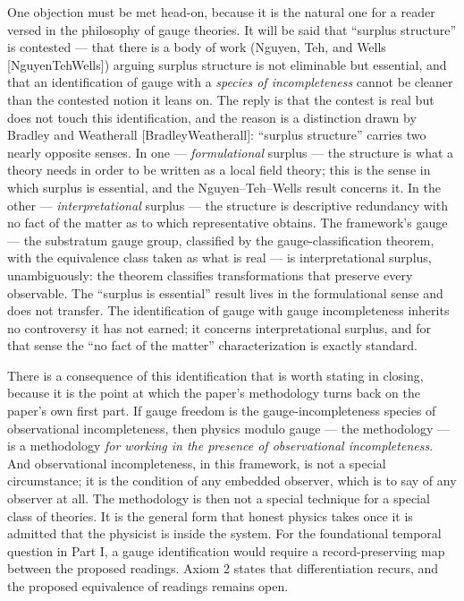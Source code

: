 \documentclass[
]{article}
\begin{document}
One objection must be met head-on, because it is the natural one for a
reader versed in the philosophy of gauge theories. It will be said that
``surplus structure'' is contested --- that there is a body of work
(Nguyen, Teh, and Wells {[}NguyenTehWells{]}) arguing surplus structure
is not eliminable but essential, and that an identification of gauge
with a \emph{species of incompleteness} cannot be cleaner than the
contested notion it leans on. The reply is that the contest is real but
does not touch this identification, and the reason is a distinction
drawn by Bradley and Weatherall {[}BradleyWeatherall{]}: ``surplus
structure'' carries two nearly opposite senses. In one ---
\emph{formulational} surplus --- the structure is what a theory needs in
order to be written as a local field theory; this is the sense in which
surplus is essential, and the Nguyen--Teh--Wells result concerns it. In
the other --- \emph{interpretational} surplus --- the structure is
descriptive redundancy with no fact of the matter as to which
representative obtains. The framework's gauge --- the substratum gauge
group, classified by the gauge-classification theorem, with the
equivalence class taken as what is real --- is interpretational surplus,
unambiguously: the theorem classifies transformations that preserve
every observable. The ``surplus is essential'' result lives in the
formulational sense and does not transfer. The identification of gauge
with gauge incompleteness inherits no controversy it has not earned; it
concerns interpretational surplus, and for that sense the ``no fact of
the matter'' characterization is exactly standard.

There is a consequence of this identification that is worth stating in
closing, because it is the point at which the paper's methodology turns
back on the paper's own first part. If gauge freedom is the
gauge-incompleteness species of observational incompleteness, then
physics modulo gauge --- the methodology --- is a methodology \emph{for
working in the presence of observational incompleteness}. And
observational incompleteness, in this framework, is not a special
circumstance; it is the condition of any embedded observer, which is to
say of any observer at all. The methodology is then not a special
technique for a special class of theories. It is the general form that
honest physics takes once it is admitted that the physicist is inside
the system. For the foundational temporal question in Part I, a gauge
identification would require a record-preserving map between the
proposed readings. Axiom 2 states that differentiation recurs, and the
proposed equivalence of readings remains open.
\end{document}
